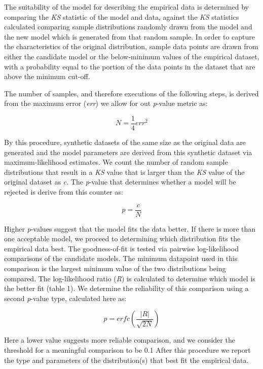 \documentclass[a4paper,fleqn]{cas-sc}
\begin{document}
The suitability of the model for describing the empirical data is determined by comparing the \textit{KS} statistic of the model and data, against the \textit{KS} statistics calculated comparing sample distributions randomly drawn from the model and the new model which is generated from that random sample. In order to capture the characteristics of the original distribution, sample data points are drawn from either the candidate model or the below-minimum values of the empirical dataset, with a probability equal to the portion of the data points in the dataset that are above the minimum cut-off.

The number of samples, and therefore executions of the following steps, is derived from the maximum error (\textit{err}) we allow for out \textit{p}-value metric as:

\begin{equation}
	N=\frac{1}{4}err^2
\end{equation}

By this procedure, synthetic datasets of the same size as the original data are generated and the model parameters are derived from this synthetic dataset via maximum-likelihood estimates. We count the number of random sample distributions that result in a \textit{KS} value that is larger than the \textit{KS} value of the original dataset as \textit{c}. The \textit{p}-value that determines whether a model will be rejected is derive from this counter as:

\begin{equation}
	p=\frac{c}{N}
\end{equation}

Higher \textit{p}-values suggest that the model fits the data better. If there is more than one acceptable model, we proceed to determining which distribution fits the empirical data best. The goodness-of-fit is tested via pairwise log-likelihood comparisons of the candidate models. The minimum datapoint used in this comparison is the largest minimum value of the two distributions being compared. The log-likelihood ratio (\textit{R}) is calculated to determine which model is the better fit (table 1). We determine the reliability of this comparison using a second \textit{p}-value type, calculated here as:

\begin{equation}
	p = erfc \left( \frac{|R|}{\sqrt{2N}} \right)
\end{equation}

Here a lower value suggests more reliable comparison, and we consider the threshold for a meaningful comparison to be 0.1 After this procedure we report the type and parameters of the distribution(s) that best fit the empirical data.
\end{document}
